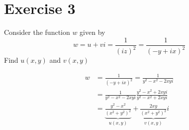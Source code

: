 \documentclass{report}
\begin{document}
    \section*{Exercise 3}
    \begin{tcolorbox}[title=Part a]
        Consider the function $w$ given by
        \begin{equation*}
            w = u + vi = \frac{1}{(iz)^2} = \frac{1}{(-y + ix)^2}
        \end{equation*}
        Find $u(x, y)$ and $v(x, y)$
    \end{tcolorbox}
    \noindent
    \begin{align*}
        w &= \frac{1}{(-y + ix)^2} = \frac{1}{y^2 - x^2 -2xyi} \\
        &= \frac{1}{y^2 - x^2 -2xyi} \frac{y^2 - x^2 + 2xyi}{y^2 - x^2 + 2xyi} \\
        &= \underbrace{\frac{y^2 - x^2}{(x^2 + y^2)^2}}_{u(x, y)} + \underbrace{\frac{2xy}{(x^2 + y^2)^2}}_{v(x, y)}i
    \end{align*}
\end{document}
